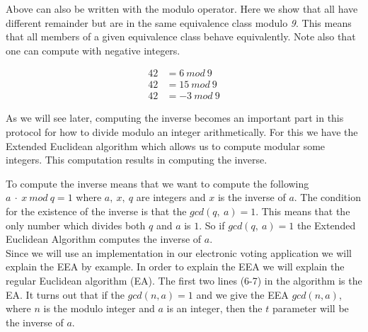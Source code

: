  Above can also be written with the modulo operator. Here we show that all have different remainder but are in the same equivalence class modulo \textit{9}. This means that all members of a given equivalence class behave equivalently. Note also that one can compute with negative integers.

\begin{align*}
42 &= 6 \ mod \ 9 \\
42 &= 15 \ mod \ 9 \\
42 &= -3 \ mod \ 9 
\end{align*}

As we will see later, computing the inverse becomes an important part in this protocol for how to divide modulo an integer arithmetically. For this we have the Extended Euclidean algorithm which allows us to compute modular some integers. This computation results in computing the inverse.


 To compute the inverse means that we want to compute the following \begin{math}a\ \cdot \ x \ mod \ q = 1 \end{math} where $a, \ x, \ q$ are integers and $x$ is the inverse of $a$. The condition for the existence of the inverse is that the $gcd(q,\ a)= 1$. This means that the only number which divides both $q$ and $a$ is $1$. So if $gcd(q,\ a)= 1$ the Extended Euclidean Algorithm computes the inverse of $a$.\\


 Since we will use an implementation in our electronic voting application we will explain the EEA by example. In order to explain the EEA we will explain the regular Euclidean algorithm (EA). The first two lines (6-7) in the algorithm is the EA. It turns out that if the $gcd(n,a)=1$  and we give the EEA $gcd(n,a)$, where $n$ is the modulo integer and $a$ is an integer, then the $t$ parameter will be the inverse of $a$. 
\cite{Paar}

